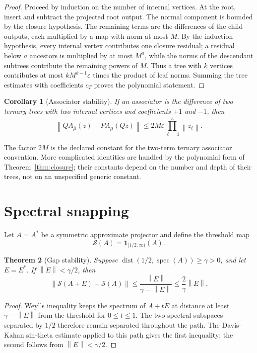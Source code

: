 \documentclass[11pt]{article}
\newtheorem{theorem}{Theorem}[section]
\newtheorem{corollary}[theorem]{Corollary}
\newcommand{\norm}[1]{\left\lVert #1\right\rVert}
\newcommand{\spec}{\operatorname{spec}}
\begin{document}
\begin{proof}
Proceed by induction on the number of internal vertices. At the root, insert and subtract the projected root output. The normal component is bounded by the closure hypothesis. The remaining terms are the differences of the child outputs, each multiplied by a map with norm at most $M$. By the induction hypothesis, every internal vertex contributes one closure residual; a residual below $a$ ancestors is multiplied by at most $M^a$, while the norms of the descendant subtrees contribute the remaining powers of $M$. Thus a tree with $k$ vertices contributes at most $kM^{k-1}\varepsilon$ times the product of leaf norms. Summing the tree estimates with coefficients $c_T$ proves the polynomial statement.
\end{proof}

\begin{corollary}[Associator stability]
\label{cor:assoc}
If an associator is the difference of two ternary trees with two internal vertices and coefficients $+1$ and $-1$, then
\[
 \norm{Q A_{\bar\mu}(z)-P A_\mu(Qz)}
 \leq 2M\varepsilon\prod_{\ell=1}^{5}\norm{z_\ell}.
\]
\end{corollary}

The factor $2M$ is the declared constant for the two-term ternary associator convention. More complicated identities are handled by the polynomial form of Theorem~\ref{thm:closure}; their constants depend on the number and depth of their trees, not on an unspecified generic constant.

\section{Spectral snapping}

Let $A=A^*$ be a symmetric approximate projector and define the threshold map
\[
    \mathcal S(A)=\mathbf 1_{[1/2,\infty)}(A).
\]

\begin{theorem}[Gap stability]
\label{thm:snap}
Suppose $\operatorname{dist}(1/2,\spec(A))\geq\gamma>0$, and let $E=E^*$. If $\norm{E}<\gamma/2$, then
\[
    \norm{\mathcal S(A+E)-\mathcal S(A)}
    \leq \frac{\norm{E}}{\gamma-\norm{E}}
    \leq \frac{2}{\gamma}\norm{E}.
\]
\end{theorem}

\begin{proof}
Weyl's inequality keeps the spectrum of $A+tE$ at distance at least $\gamma-\norm{E}$ from the threshold for $0\leq t\leq1$. The two spectral subspaces separated by $1/2$ therefore remain separated throughout the path. The Davis--Kahan sin-theta estimate applied to this path gives the first inequality; the second follows from $\norm{E}<\gamma/2$.
\end{proof}
\end{document}
